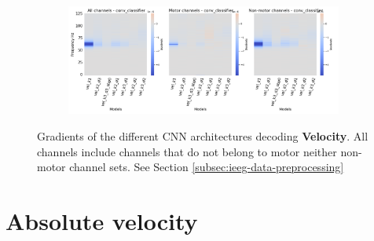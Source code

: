 \begin{figure}[!htpb]
\begin{subfigure}[d]{\textwidth}
   \includegraphics[width=1\linewidth]{img/appendix/A/conv-classifier/hp-m/vel-model_gradients_all_kinds}
   \caption{}
   \label{fig:vel-hp-grads-conv-classifier}
\end{subfigure}

\caption[]{Gradients of the different CNN architectures decoding \textbf{Velocity}.  All channels include channels that do not belong to motor neither non-motor channel sets. See Section \ref{subsec:ieeg-data-preprocessing}}
\label{fig:vel-hp-grads}
\end{figure}

\section*{Absolute velocity}\label{sec:absolute-velocity-appendixA}

